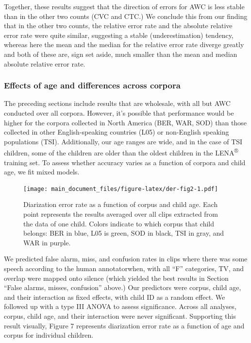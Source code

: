 \documentclass[english,floatsintext,man]{apa6}
\begin{document}
Together, these results suggest that the direction of errors for AWC is
less stable than in the other two counts (CVC and CTC.) We conclude this
from our finding that in the other two counts, the relative error rate
and the absolute relative error rate were quite similar, suggesting a
stable (underestimation) tendency, whereas here the mean and the median
for the relative error rate diverge greatly and both of these are, sign
set aside, much smaller than the mean and median absolute relative error
rate.

\subsubsection{Effects of age and differences across
corpora}\label{effects-of-age-and-differences-across-corpora}

The preceding sections include results that are wholesale, with all but
AWC conducted over all corpora. However, it's possible that performance
would be higher for the corpora collected in North America (BER, WAR,
SOD) than those collected in other English-speaking countries (L05) or
non-English speaking populations (TSI). Additionally, our age ranges are
wide, and in the case of TSI children, some of the children are older
than the oldest children in the LENA\textsuperscript{®} training set. To
assess whether accuracy varies as a function of corpora and child age,
we fit mixed models.

\begin{figure}
\centering
\texttt{[image: main\_document\_files/figure-latex/der-fig2-1.pdf]}
\caption{\label{fig:der-fig2}Diarization error rate as a function of corpus
and child age. Each point represents the results averaged over all clips
extracted from the data of one child. Colors indicate to which corpus
that child belongs: BER in blue, L05 is green, SOD in black, TSI in
gray, and WAR in purple.}
\end{figure}

We predicted false alarm, miss, and confusion rates in clips where there
was some speech according to the human annotatorwhen, with all
\enquote{F} categories, TV, and overlap were mapped onto silence (which
yielded the best results in Section \enquote{False alarms, misses,
confusion} above.) Our predictors were corpus, child age, and their
interaction as fixed effects, with child ID as a random effect. We
followed up with a type III ANOVA to assess significance. Across all
analyses, corpus, child age, and their interaction were never
significant. Supporting this result visually, Figure 7 represents
diarization error rate as a function of age and corpus for individual
children.
\end{document}
